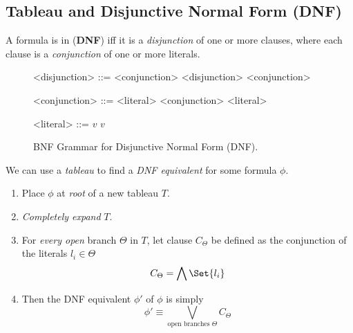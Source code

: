 \subsection{Tableau and Disjunctive Normal Form (DNF)}

\begin{definition}
    A formula is in  (\textbf{DNF}) iff
    it is a \textit{disjunction} of one or more clauses, where each
    clause is a \textit{conjunction} of one or more literals.
    
    \begin{figure}[H]
        \centering
        \begin{grammar}
        <disjunction> ::= \lit{$($} <conjunction> \lit{$\lor$} 
                <disjunction> \lit{$)$}
            \alt <conjunction>
        
        <conjunction> ::= \lit{$($} <literal> \lit{$\lor$} 
                <conjunction> \lit{$)$}
            \alt <literal>
        
        <literal> ::= \lit{$\neg$} $v$ 
                \quad{}
            \alt $v$
                \quad{}
        \end{grammar}
        \caption{BNF Grammar for Disjunctive Normal Form (DNF).}
        \label{fig:dnf_bnf}
    \end{figure}
\end{definition}

\begin{definition}
    We can use a \textit{tableau} to find a \textit{DNF equivalent} for
    some formula $\phi$.
    
    \begin{enumerate}
        \item Place $\phi$ at \textit{root} of a new tableau $T$.
        \item \textit{Completely expand} $T$.
        \item For \textit{every open} branch $\Theta$ in $T$, let
            clause $C_\Theta$ be defined as the conjunction of
            the literals $l_i \in \Theta$
            \begin{equation}
                C_\Theta = \bigwedge \Set{ l_i }
            \end{equation}
        \item Then the DNF equivalent $\phi'$ of $\phi$ is simply
            \begin{equation}
                \phi' \equiv \bigvee \limits_{\text{open branches } \Theta} C_\Theta
            \end{equation}
    \end{enumerate}
\end{definition}
